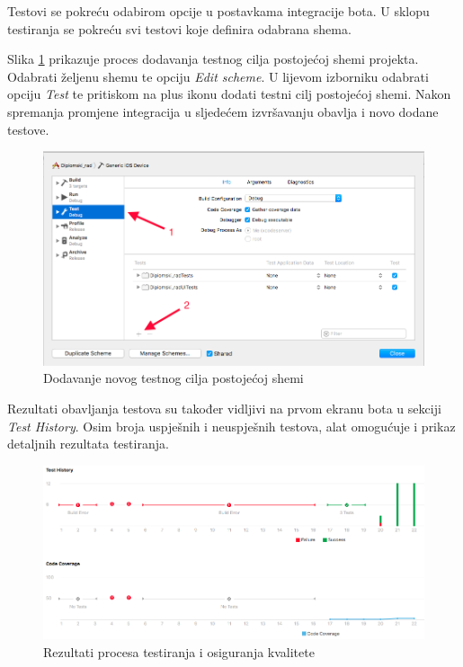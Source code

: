 \documentclass[times, utf8, diplomski, numeric]{fer}
\begin{document}
\begin{appendices}
Testovi se pokreću odabirom opcije  u postavkama integracije bota. U sklopu testiranja se pokreću svi testovi koje definira odabrana shema.

Slika \ref{fig:AddingTests} prikazuje proces dodavanja testnog cilja postojećoj shemi projekta. Odabrati željenu shemu te opciju \textit{Edit scheme}. U lijevom izborniku odabrati opciju \textit{Test} te pritiskom na plus ikonu dodati testni cilj postojećoj shemi. Nakon spremanja promjene integracija u sljedećem izvršavanju obavlja i novo dodane testove.

\begin{figure}
\centering
\includegraphics[scale=0.4]{AddingTests}
\caption{Dodavanje novog testnog cilja postojećoj shemi}
\label{fig:AddingTests}
\end{figure}

Rezultati obavljanja testova su također vidljivi na prvom ekranu bota u sekciji \textit{Test History}. Osim broja uspješnih i neuspješnih testova, alat omogućuje i prikaz detaljnih rezultata testiranja.

\begin{figure}[b!]
\centering
\includegraphics[scale=0.4]{XcodeServerTestResult}
\caption{Rezultati procesa testiranja i osiguranja kvalitete}
\label{fig:XcodeServerTestResult}
\end{figure}


\end{appendices}
\end{document}
